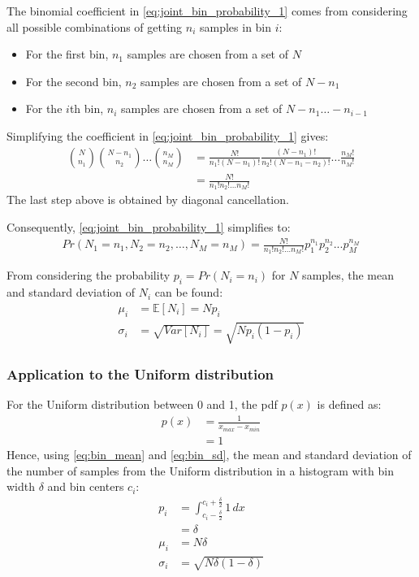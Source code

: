 \documentclass[a4paper]{article}
\begin{document}
The binomial coefficient in \autoref{eq:joint_bin_probability_1} comes from considering all possible combinations of
getting $n_i$ samples in bin $i$:
\begin{itemize}
    \item For the first bin, $n_1$ samples are chosen from a set of $N$
    \item For the second bin, $n_2$ samples are chosen from a set of $N - n_1$
    \item For the $i$th bin, $n_i$ samples are chosen from a set of $N - n_1 \dots - n_{i-1}$
\end{itemize}
Simplifying the coefficient in \autoref{eq:joint_bin_probability_1} gives:
\begin{align*}
    {N \choose n_1}{N - n_1 \choose n_2} \dots {n_M \choose n_M}
  & = \frac{N!}{n_1!(N - n_1)!} \frac{(N - n_1)!}{n_2!(N - n_1 - n_2)!} \dots \frac{n_M!}{n_M!} \\
  & = \frac{N!}{n_1! n_2! \dots n_M!}
\end{align*}
The last step above is obtained by diagonal cancellation.

Consequently, \autoref{eq:joint_bin_probability_1} simplifies to:
\begin{align*}
    Pr(N_1 = n_1, N_2 = n_2, \dots, N_M = n_M) = \frac{N!}{n_1! n_2! \dots n_M!} p_1^{n_1} p_2^{n_2} ... p_M^{n_M}
\end{align*}

From considering the probability $p_i = Pr(N_i = n_i)$ for $N$ samples, the mean and standard deviation of $N_i$ can be
found:
\begin{align}
    \label{eq:bin_mean}
    \mu_i &= \mathbb{E}[N_i] = N p_i \\
    \label{eq:bin_sd}
    \sigma_i &= \sqrt{Var[N_i]} = \sqrt{N p_i (1 - p_i)}
\end{align}


\subsubsection{Application to the Uniform distribution}
For the Uniform distribution between 0 and 1, the pdf $p(x)$ is defined as:
\begin{align*}
    p(x) &= \frac{1}{x_{max} - x_{min}} \\
         &= 1
\end{align*}
Hence, using \autoref{eq:bin_mean} and \autoref{eq:bin_sd}, the mean and standard deviation of the number of samples from the
Uniform distribution in a histogram with bin width $\delta$ and bin centers $c_i$:
\begin{align*}
    p_i &= \int_{c_i - \frac{\delta}{2}}^{c_i + \frac{\delta}{2}}1\,dx \\
        &= \delta \\
    \mu_i &= N \delta \\
    \sigma_i &= \sqrt{N \delta (1 - \delta)}
\end{align*}
\end{document}
